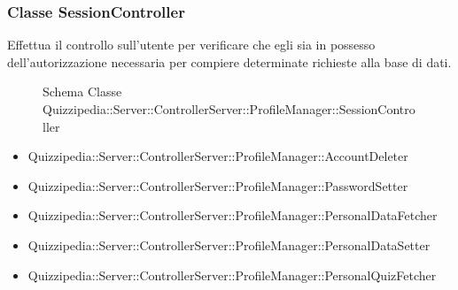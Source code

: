 \subsubsection{Classe SessionController}
Effettua il controllo sull'utente per verificare che egli sia in possesso dell'autorizzazione necessaria per compiere determinate richieste alla base di dati.
\begin{figure}[H]
\centering
\noindent{}
\caption[Schema Classe SessionController]{Schema Classe Quizzipedia::Server::ControllerServer::ProfileManager::SessionController}
\end{figure}
\begin{itemize}
\item Quizzipedia::Server::ControllerServer::ProfileManager::AccountDeleter
\item Quizzipedia::Server::ControllerServer::ProfileManager::PasswordSetter
\item Quizzipedia::Server::ControllerServer::ProfileManager::PersonalDataFetcher
\item Quizzipedia::Server::ControllerServer::ProfileManager::PersonalDataSetter
\item Quizzipedia::Server::ControllerServer::ProfileManager::PersonalQuizFetcher
\end{itemize}
